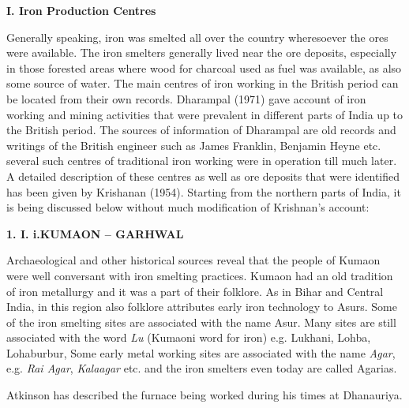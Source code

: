 \textbf{I. Iron Production Centres}

Generally speaking, iron was smelted all over the country wheresoever the ores were available. The iron smelters generally lived near the ore deposits, especially in those forested areas where wood for charcoal used as fuel was available, as also some source of water. The main centres of iron working in the British period can be located from their own records. Dharampal (1971) gave account of iron working and mining activities that were prevalent in different parts of India up to the British period. The sources of information of Dharampal are old records and writings of the British engineer such as James Franklin, Benjamin Heyne etc. several such centres of traditional iron working were in operation till much later. A detailed description of these centres as well as ore deposits that were identified has been given by Krishanan (1954). Starting from the northern parts of India, it is being discussed below without much modification of Krishnan’s account:

\textbf{1. I. i.}\textbf{KUMAON – GARHWAL}

Archaeological and other historical sources reveal that the people of Kumaon were well conversant with iron smelting practices. Kumaon had an old tradition of iron metallurgy and it was a part of their folklore. As in Bihar and Central India, in this region also folklore attributes early iron technology to Asurs. Some of the iron smelting sites are associated with the name Asur. Many sites are still associated with the word \textit{Lu} (Kumaoni word for iron) e.g. Lukhani, Lohba, Lohaburbur, Some early metal working sites are associated with the name \textit{Agar}, e.g. \textit{Rai Agar}, \textit{Kalaagar} etc. and the iron smelters even today are called Agarias.

Atkinson has described the furnace being worked during his times at Dhanauriya.

